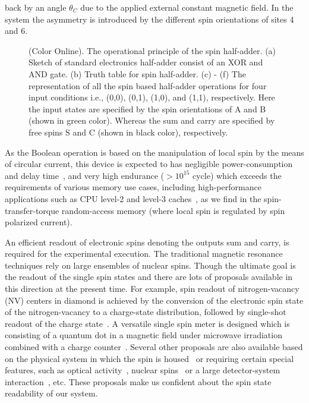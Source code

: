 \documentclass[prb,aps,twocolumn,amsmath,amssymb,floatfix,superscriptaddress]{revtex4}
\begin{document}
back by an angle $\theta_C$ due to the applied external constant magnetic field. In the system
the asymmetry is introduced by the different spin
orientations of sites 4 and 6.
\begin{figure*}
{\centering{}\par}
\caption{(Color Online). The operational principle of the spin half-adder. (a) Sketch of
standard electronics half-adder consist of an XOR and AND gate. (b) Truth table for spin
half-adder. (c) - (f) The  representation of all the spin based half-adder operations
for four input conditions i.e., (0,0), (0,1), (1,0), and (1,1), respectively. Here the
input states are specified by the spin orientations of A and B (shown in green
color). Whereas the sum and carry are specified by free spins S and C (shown in
black color), respectively.}
\label{fig2}
\end{figure*}
As the Boolean operation is based on the manipulation of local spin by the
means of circular current, this device is expected to has negligible power-consumption and delay
time~\cite{mp}, and very high endurance ($> 10^{15}$ cycle) which exceeds the requirements of various
memory use cases, including high-performance applications such as CPU level-2 and level-3
caches~\cite{en}, as we find in the spin-transfer-torque random-access memory (where local spin
is regulated by spin polarized current).

An efficient readout of electronic spins denoting the outputs sum and carry, is
required for the experimental execution. The traditional magnetic resonance techniques rely on large
ensembles of nuclear spins. Though the ultimate goal is the readout of the single spin states and there
are lots of proposals available in this direction at the present time. For example,
spin readout of nitrogen-vacancy (NV) centers in diamond is achieved by the conversion of the
electronic spin state of the nitrogen-vacancy to a charge-state distribution, followed by
single-shot readout of the charge state~\cite{sr1}. A versatile single spin meter is designed which
is consisting of a quantum dot in a magnetic field under microwave irradiation combined with a charge
counter~\cite{sr2}. Several other proposals are also available based on the physical system in which
the spin is housed~\cite{sr3} or requiring certain special features, such as optical activity~\cite{sr4},
nuclear spins~\cite{sr5} or a large detector-system interaction~\cite{sr6}, etc. These proposals make us
confident about the spin state readability of our system.
\end{document}

